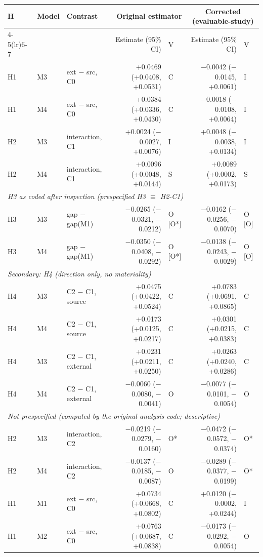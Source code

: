 \begin{tabular}{lllrlrl}
\toprule
H & Model & Contrast & \multicolumn{2}{c}{Original estimator} & \multicolumn{2}{c}{Corrected (evaluable-study)}\\
\cmidrule(lr){4-5}\cmidrule(lr){6-7}
 & & & Estimate (95\% CI) & V & Estimate (95\% CI) & V\\
\midrule
H1 & M3 & ext $-$ src, C0 & +0.0469 (+0.0408, +0.0531) & C & $-$0.0042 ($-$0.0145, +0.0061) & I\\
H1 & M4 & ext $-$ src, C0 & +0.0384 (+0.0336, +0.0430) & C & $-$0.0018 ($-$0.0108, +0.0064) & I\\
H2 & M3 & interaction, C1 & +0.0024 ($-$0.0027, +0.0076) & I & +0.0048 ($-$0.0038, +0.0134) & I\\
H2 & M4 & interaction, C1 & +0.0096 (+0.0048, +0.0144) & S & +0.0089 (+0.0002, +0.0173) & S\\
\midrule\multicolumn{7}{l}{\emph{H3 as coded after inspection (prespecified H3 $\equiv$ H2-C1)}}\\
H3 & M3 & gap $-$ gap(M1) & $-$0.0265 ($-$0.0321, $-$0.0212) & O [O*] & $-$0.0162 ($-$0.0256, $-$0.0070) & O [O]\\
H3 & M4 & gap $-$ gap(M1) & $-$0.0350 ($-$0.0408, $-$0.0292) & O [O*] & $-$0.0138 ($-$0.0243, $-$0.0029) & O [O]\\
\midrule\multicolumn{7}{l}{\emph{Secondary: H4 (direction only, no materiality)}}\\
H4 & M3 & C2 $-$ C1, source & +0.0475 (+0.0422, +0.0524) & C & +0.0783 (+0.0691, +0.0865) & C\\
H4 & M4 & C2 $-$ C1, source & +0.0173 (+0.0125, +0.0217) & C & +0.0301 (+0.0215, +0.0383) & C\\
H4 & M3 & C2 $-$ C1, external & +0.0231 (+0.0211, +0.0250) & C & +0.0263 (+0.0240, +0.0286) & C\\
H4 & M4 & C2 $-$ C1, external & $-$0.0060 ($-$0.0080, $-$0.0041) & O & $-$0.0077 ($-$0.0101, $-$0.0054) & O\\
\midrule\multicolumn{7}{l}{\emph{Not prespecified (computed by the original analysis code; descriptive)}}\\
H2 & M3 & interaction, C2 & $-$0.0219 ($-$0.0279, $-$0.0160) & O* & $-$0.0472 ($-$0.0572, $-$0.0374) & O*\\
H2 & M4 & interaction, C2 & $-$0.0137 ($-$0.0185, $-$0.0087) & O & $-$0.0289 ($-$0.0377, $-$0.0199) & O*\\
H1 & M1 & ext $-$ src, C0 & +0.0734 (+0.0668, +0.0802) & C & +0.0120 ($-$0.0002, +0.0244) & I\\
H1 & M2 & ext $-$ src, C0 & +0.0763 (+0.0687, +0.0838) & C & $-$0.0173 ($-$0.0292, $-$0.0054) & O\\
\bottomrule
\end{tabular}
